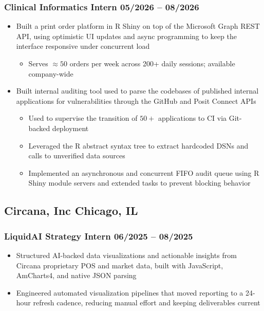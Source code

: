 \documentclass[10pt]{article} %
\begin{document}
\subsubsection{Clinical Informatics Intern \hfill 05/2026 -- 08/2026}
\begin{itemize}
	\item Built a print order platform in R Shiny on top of the Microsoft Graph REST API, using optimistic UI updates and async programming to keep the interface responsive under concurrent load
	\vspace{-2pt}
	\begin{itemize}
		\item Serves $\approx 50$ orders per week across 200+ daily sessions; available company-wide
	\end{itemize}
	\item Built internal auditing tool used to parse the codebases of published internal applications for vulnerabilities through the GitHub and Posit Connect APIs
	\vspace{-2pt}
	\begin{itemize}
		\item Used to supervise the transition of $50+$ applications to CI via Git-backed deployment
		\item Leveraged the R abstract syntax tree to extract hardcoded DSNs and calls to unverified data sources
		\item Implemented an asynchronous and concurrent FIFO audit queue using R Shiny module servers and extended tasks to prevent blocking behavior
	\end{itemize}
\end{itemize}

\subsection{Circana, Inc \hfill Chicago, IL}
\subsubsection{LiquidAI Strategy Intern \hfill 06/2025 -- 08/2025}
\begin{itemize}
	\item Structured AI-backed data visualizations and actionable insights from Circana proprietary POS and market data, built with JavaScript, AmCharts4, and native JSON parsing
	\item Engineered automated visualization pipelines that moved reporting to a 24-hour refresh cadence, reducing manual effort and keeping deliverables current
\end{itemize}
\end{document}
